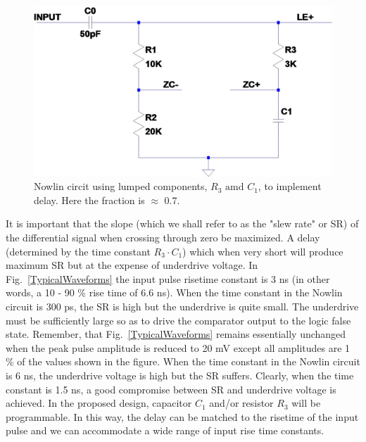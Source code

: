 \documentclass[12pt, onecolumn]{IEEEtran}
\begin{document}
\begin{figure}[htbp!]
	\centering
 	\includegraphics[scale=0.3,keepaspectratio=true]{./images/nowlin.jpg}
 	\caption{Nowlin circit using lumped components, $R_3 \text{ amd } C_1$, to implement delay. Here the fraction is $\approx$ 0.7.}
 	\label{Nowlin}
\end{figure}

\noindent
It is important that the slope (which we shall refer to as the "slew rate" or SR) of the differential signal when crossing through zero be maximized.  A delay (determined by the time constant $R_3 \cdot C_1$) which when very short will produce maximum SR but at the expense of underdrive voltage. In Fig.~\ref{TypicalWaveforms} the input pulse risetime constant is 3 ns (in other words,  a 10 - 90 \% rise time of 6.6 ns).  When the time constant in the Nowlin circuit is 300 ps, the SR is high but the underdrive is quite small. The underdrive must be sufficiently large so as to drive the comparator output to the logic false state.  Remember, that Fig.~\ref{TypicalWaveforms} remains essentially unchanged when the peak pulse amplitude is reduced to 20 mV except all amplitudes are 1 \% of the values shown in the figure. When the time constant in the Nowlin circuit is 6 ns, the underdrive voltage is high but the SR suffers. Clearly, when the time constant is 1.5 ns, a good compromise between SR and underdrive voltage is achieved. In the proposed design, capacitor $C_1$ and/or resistor $R_3$ will be programmable. In this way, the delay can be matched to the risetime of the input pulse and we can accommodate a wide range of input rise time constants. \\
\end{document}
